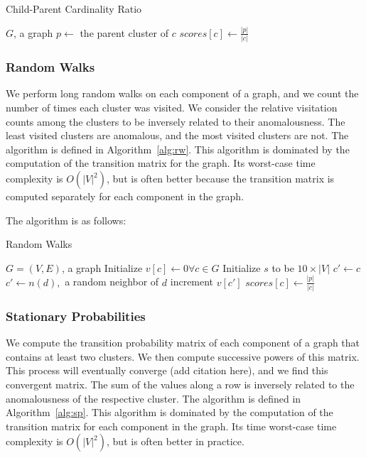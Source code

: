 \begin{algorithm}[h]
    \caption{Child-Parent Cardinality Ratio}
    \label{alg:cpcr}
\begin{algorithmic}[1]
    \Require $G$, a graph
        \State $p \gets$ the parent cluster of $c$
        \State $scores[c] \gets \frac{|p|}{|c|}$
    \EndFor
\end{algorithmic}
\end{algorithm}


\subsubsection{Random Walks}
We perform long random walks on each component of a graph, and we count the number of times each cluster was visited.
We consider the relative visitation counts among the clusters to be inversely related to their anomalousness.
The least visited clusters are anomalous, and the most visited clusters are not. The algorithm is defined in Algorithm~\ref{alg:rw}.
This algorithm is dominated by the computation of the transition matrix for the graph.
Its worst-case time complexity is $O(|V|^2)$, but is often better because the transition matrix is computed separately for each component in the graph.

The algorithm is as follows:

\begin{algorithm}[h]
    \caption{Random Walks}
    \label{alg:rw}
\begin{algorithmic}[1]
    \Require $G = (V,E)$, a graph
    \State Initialize $v[c] \gets 0 \forall c \in G$
    \State Initialize $s$ to be $10 \times |V|$
        \State $c' \gets c$
            \State $c' \gets n(d),$ a random neighbor of $d$
            \State increment $v[c']$
        \EndFor
    \EndFor
        \State $scores[c] \gets \frac{|p|}{|c|}$
    \EndFor
\end{algorithmic}
\end{algorithm}


\subsubsection{Stationary Probabilities}
We compute the transition probability matrix of each component of a graph that contains at least two clusters.
We then compute successive powers of this matrix. %
This process will eventually converge (add citation here), and we find this convergent matrix.
The sum of the values along a row is inversely related to the anomalousness of the respective cluster. The algorithm is defined in Algorithm~\ref{alg:sp}.
This algorithm is dominated by the computation of the transition matrix for each component in the graph.
Its time worst-case time complexity is $O(|V|^2)$, but is often better in practice.

